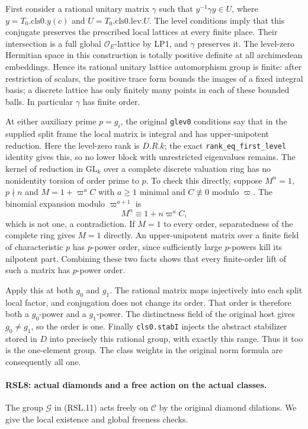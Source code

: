 First consider a rational unitary matrix $\gamma$ such that
$y^{-1}\gamma y\in U$, where $y=T_0.\mathrm{cls0}.y(c)$ and
$U=T_0.\mathrm{cls0}.\mathrm{lev}.U$.  The level conditions imply
that this conjugate preserves the prescribed local lattices at
every finite place.  Their intersection is a full global
$\mathcal O_E$-lattice by LP1, and $\gamma$ preserves it.  The
level-zero Hermitian space in this construction is totally
positive definite at all archimedean embeddings.  Hence its
rational unitary lattice automorphism group is finite: after
restriction of scalars, the positive trace form bounds the images
of a fixed integral basis; a discrete lattice has only finitely
many points in each of these bounded balls.  In particular
$\gamma$ has finite order.

At either auxiliary prime $p=g_i$, the original
\texttt{glev0} conditions say that in the supplied split frame
the local matrix is integral and has upper-unipotent reduction.
Here the level-zero rank is $D.R.k$; the exact
\texttt{rank\_eq\_first\_level} identity gives this, so no
lower block with unrestricted eigenvalues remains.  The kernel
of reduction in $\mathrm{GL}_k$ over a complete discrete
valuation ring has no nonidentity torsion of order prime to
$p$.  To check this directly, suppose $M^n=1$, $p\nmid n$ and
$M=1+\varpi^a C$ with $a\ge1$ minimal and $C\not\equiv0$
modulo $\varpi$.  The binomial expansion modulo
$\varpi^{a+1}$ is
\[
                    M^n\equiv1+n\varpi^a C,
\]
which is not one, a contradiction.  If $M=1$ to every order,
separatedness of the complete ring gives $M=1$ directly.
An upper-unipotent matrix over a finite field of characteristic
$p$ has $p$-power order, since sufficiently large $p$-powers
kill its nilpotent part.  Combining these two facts shows that
every finite-order lift of such a matrix has $p$-power order.

Apply this at both $g_0$ and $g_1$.  The rational matrix maps
injectively into each split local factor, and conjugation does
not change its order.  That order is therefore both a
$g_0$-power and a $g_1$-power.  The distinctness field of the
original host gives $g_0\ne g_1$, so the order is one.
Finally \texttt{cls0.stabI} injects the abstract stabilizer
stored in $D$ into precisely this rational group, with exactly
this range.  Thus it too is the one-element group.  The class
weights in the original norm formula are consequently all one.

\paragraph{RSL8: actual diamonds and a free action on the actual classes.}
\label{claim:RSL8}
The group $\mathscr G$ in (RSL.11) acts freely on $\mathscr C$
by the original diamond dilations.  We give the local existence
and global freeness checks.

